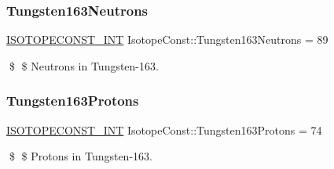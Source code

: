 \subsubsection{\texorpdfstring{Tungsten163\+Neutrons}{Tungsten163Neutrons}}
{\footnotesize\ttfamily \mbox{\hyperlink{group___isotope_const-_macros_ga5f18360b3e99483a35c32d789e62621c}{I\+S\+O\+T\+O\+P\+E\+C\+O\+N\+S\+T\+\_\+\+I\+NT}} Isotope\+Const\+::\+Tungsten163\+Neutrons = 89}

\$ \$ Neutrons in Tungsten-\/163. \mbox{\label{group___isotope_const-_tungsten-_w163_ga3b0ba55d49cbe1ab2a62cb9466dae9d4}} 
\subsubsection{\texorpdfstring{Tungsten163\+Protons}{Tungsten163Protons}}
{\footnotesize\ttfamily \mbox{\hyperlink{group___isotope_const-_macros_ga5f18360b3e99483a35c32d789e62621c}{I\+S\+O\+T\+O\+P\+E\+C\+O\+N\+S\+T\+\_\+\+I\+NT}} Isotope\+Const\+::\+Tungsten163\+Protons = 74}

\$ \$ Protons in Tungsten-\/163. 